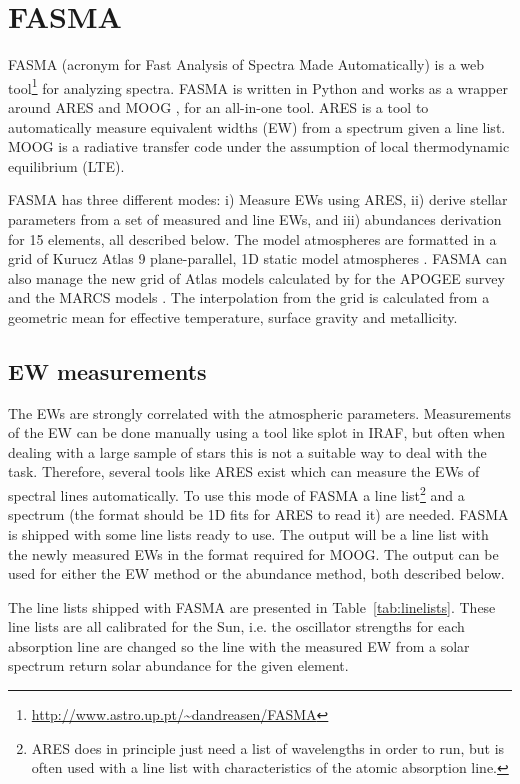 \documentclass{aa}
\begin{document}
\section{FASMA}
\label{sec:FASMA}
FASMA (acronym for Fast Analysis of Spectra Made Automatically) is a web
tool\footnote{\url{http://www.astro.up.pt/~dandreasen/FASMA}} for analyzing
spectra. FASMA is written in Python and works as a wrapper around ARES
\citep{Sousa2015a} and MOOG \citep[][version 2014]{Sneden1973}, for an
all-in-one tool. ARES is a tool to automatically measure equivalent widths (EW)
from a spectrum given a line list. MOOG is a radiative transfer code under the
assumption of local thermodynamic equilibrium (LTE).

FASMA has three different modes: i) Measure EWs using ARES, ii) derive stellar
parameters from a set of measured  and  line EWs, and
iii) abundances derivation for 15 elements, all described below. The model
atmospheres are formatted in a grid of Kurucz Atlas 9 plane-parallel, 1D static
model atmospheres \citet{Kurucz1993}. FASMA can also manage the new grid of
Atlas models calculated by \citet{Meszaros2012} for the APOGEE survey and the
MARCS models \citep{Gustafson2008}. The interpolation from the grid is
calculated from a geometric mean for effective temperature, surface gravity and
metallicity.



\subsection{EW measurements}
\label{sub:EW_measurements}
The EWs are strongly correlated with the atmospheric parameters. Measurements of
the EW can be done manually using a tool like splot in IRAF, but often when
dealing with a large sample of stars this is not a suitable way to deal with the
task. Therefore, several tools like ARES exist which can measure the EWs of
spectral lines automatically. To use this mode of FASMA a line
list\footnote{ARES does in principle just need a list of wavelengths in order to
run, but is often used with a line list with characteristics of the atomic
absorption line.} and a spectrum (the format should be 1D fits for ARES to read
it) are needed. FASMA is shipped with some line lists ready to use. The output
will be a line list with the newly measured EWs in the format required for MOOG.
The output can be used for either the EW method or the abundance method, both
described below.

The line lists shipped with FASMA are presented in Table~\ref{tab:linelists}.
These line lists are all calibrated for the Sun, i.e. the oscillator strengths
for each absorption line are changed so the line with the measured EW from a
solar spectrum return solar abundance for the given element.
\end{document}
